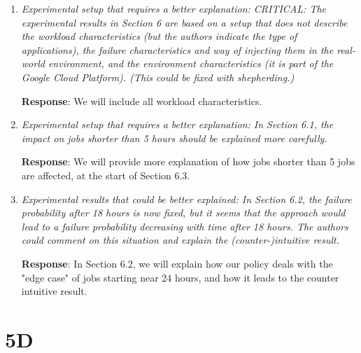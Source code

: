 \documentclass{article}
\newcommand{\resp}[1]{\textbf{Response}: #1}
\newcommand{\revmade}[1]{\textbf{Revision Made}: #1}
\begin{document}
\begin{enumerate}
\item \emph{Experimental setup that requires a better explanation: CRITICAL: The experimental results in Section 6 are based on a setup that does not describe the workload characteristics (but the authors indicate the type of applications), the failure characteristics and way of injecting them in the real-world environment, and the environment characteristics (it is part of the Google Cloud Platform). (This could be fixed with shepherding.)}

\resp{We will include all workload characteristics. }

\item \emph{Experimental setup that requires a better explanation: In Section 6.1, the impact on jobs shorter than 5 hours should be explained more carefully. }

\resp{We will provide more explanation of how jobs shorter than 5 jobs are affected, at the start of Section 6.3.}

\item \emph{Experimental results that could be better explained:  In Section 6.2, the failure probability after 18 hours is now fixed, but it seems that the approach would lead to a failure probability decreasing with time after 18 hours. The authors could comment on this situation and explain the (counter-)intuitive result.}

\resp{In Section 6.2, we will explain how our policy deals with the "edge case" of jobs starting near 24 hours, and how it leads to the counter intuitive result.}


\end{enumerate}

\section{5D}
\end{document}
